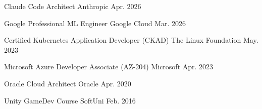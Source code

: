 


\begin{cvhonors}

  \cvhonor
    {Claude Code Architect}
    {Anthropic}
    {}
    {Apr. 2026}

  \cvhonor
    {Google Professional ML Engineer}
    {Google Cloud}
    {}
    {Mar. 2026}

  \cvhonor
    {Certified Kubernetes Application Developer (CKAD)}
    {The Linux Foundation}
    {}
    {May. 2023}

  \cvhonor
    {Microsoft Azure Developer Associate (AZ-204)}
    {Microsoft}
    {}
    {Apr. 2023}

  \cvhonor
    {Oracle Cloud Architect}
    {Oracle}
    {}
    {Apr. 2020}

  \cvhonor
    {Unity GameDev Course}
    {SoftUni}
    {}
    {Feb. 2016}
  \\[-0.8\baselineskip]

\end{cvhonors}

